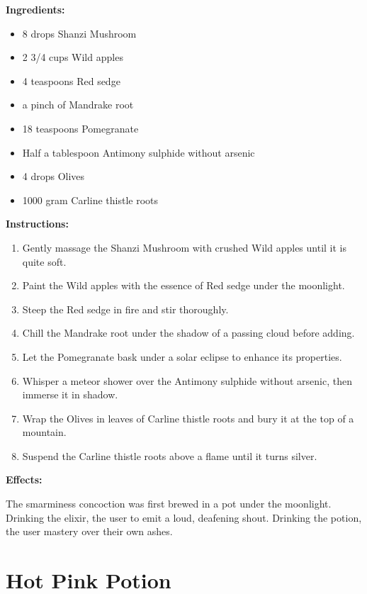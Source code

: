 \documentclass{article}
\begin{document}
\textbf{Ingredients:}

\begin{itemize}
  \item 8 drops Shanzi Mushroom
  \item 2 3/4 cups Wild apples
  \item 4 teaspoons Red sedge
  \item a pinch of Mandrake root
  \item 18 teaspoons Pomegranate
  \item Half a tablespoon Antimony sulphide without arsenic
  \item 4 drops Olives
  \item 1000 gram Carline thistle roots
\end{itemize}

\textbf{Instructions:}

\begin{enumerate}
  \item Gently massage the Shanzi Mushroom with crushed Wild apples until it is quite soft.
  \item Paint the Wild apples with the essence of Red sedge under the moonlight.
  \item Steep the Red sedge in fire and stir thoroughly.
  \item Chill the Mandrake root under the shadow of a passing cloud before adding.
  \item Let the Pomegranate bask under a solar eclipse to enhance its properties.
  \item Whisper a meteor shower over the Antimony sulphide without arsenic, then immerse it in shadow.
  \item Wrap the Olives in leaves of Carline thistle roots and bury it at the top of a mountain.
  \item Suspend the Carline thistle roots above a flame until it turns silver.
\end{enumerate}

\textbf{Effects:}

The smarminess concoction was first brewed in a pot under the moonlight. Drinking the elixir, the user to emit a loud, deafening shout. Drinking the potion, the user mastery over their own ashes.

\newpage
\section*{Hot Pink Potion}
\end{document}
